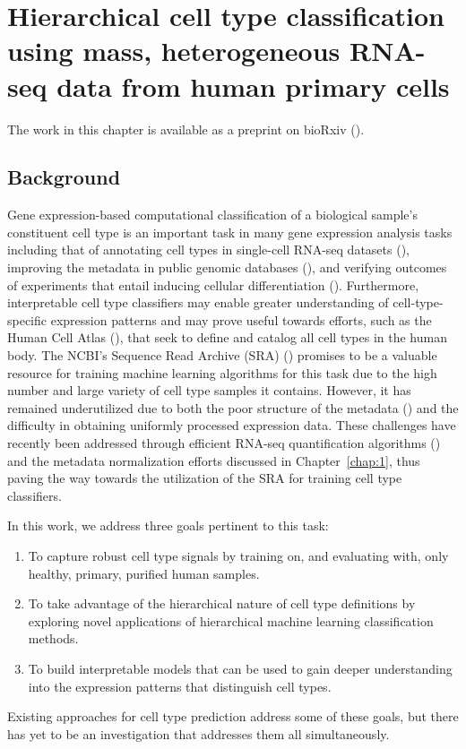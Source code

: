 \chapter{Hierarchical cell type classification using mass, heterogeneous RNA-seq data from human primary cells} \label{chap:2}

The work in this chapter is available as a preprint on bioRxiv (\citealp{Bernstein2019}). 

\section{Background}

Gene expression-based computational classification of a biological sample's constituent cell type is an important task in many gene expression analysis tasks including that of annotating cell types in single-cell RNA-seq datasets (\citealp{Alavi2018, Lin2017}), improving the metadata in public genomic databases (\citealp{Lee2013, Ellis}), and verifying outcomes of experiments that entail inducing cellular differentiation (\citealp{Cahan, Radley2017}).  Furthermore, interpretable cell type classifiers may enable greater understanding of cell-type-specific expression patterns and may prove useful towards efforts, such as the Human Cell Atlas (\citealp{Regev2017}), that seek to define and catalog all cell types in the human body.  The NCBI's Sequence Read Archive (SRA) (\citealp{Leinonen2011}) promises to be a valuable resource for training machine learning algorithms for this task due to the high number and large variety of cell type samples it contains.   However, it has remained underutilized due to both the poor structure of the metadata (\citealp{Goncalves2017}) and the difficulty in obtaining uniformly processed expression data. These challenges have recently been addressed through efficient RNA-seq quantification algorithms (\citealp{Patro2017, Bray2016}) and the metadata normalization efforts discussed in Chapter~\ref{chap:1}, thus paving the way towards the utilization of the SRA for training cell type classifiers. 

In this work, we address three goals pertinent to this task:
\begin{enumerate}
    \item To capture robust cell type signals by training on, and evaluating with, only healthy, primary, purified human samples.
    \item To take advantage of the hierarchical nature of cell type definitions by exploring novel applications of hierarchical machine learning classification methods.
    \item To build interpretable models that can be used to gain deeper understanding into the expression patterns that distinguish cell types.
\end{enumerate}
Existing approaches for cell type prediction address some of these goals, but there has yet to be an investigation that addresses them all simultaneously. 

